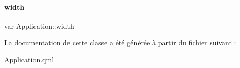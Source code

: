 \paragraph{\texorpdfstring{width}{width}}
{\footnotesize\ttfamily var Application\+::width\hspace{0.3cm}{\ttfamily [private]}}



La documentation de cette classe a été générée à partir du fichier suivant \+:\begin{DoxyCompactItemize}
\item 
\hyperlink{_application_8qml}{Application.\+qml}\end{DoxyCompactItemize}
